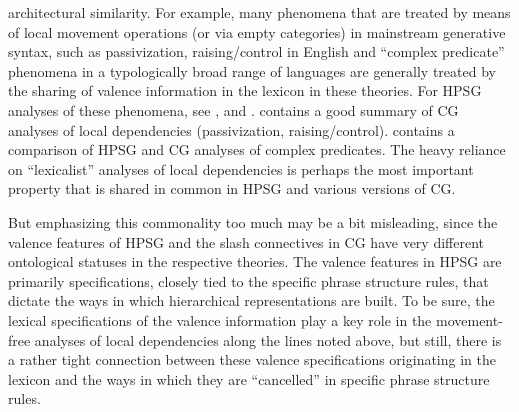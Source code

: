 \documentclass[output=paper
                ,modfonts
                ,nonflat
	        ,collection
	        ,collectionchapter
	        ,collectiontoclongg
 	        ,biblatex
                ,babelshorthands
                ,newtxmath
                ,draftmode
                ,colorlinks, citecolor=brown
]{./langsci/langscibook}
\begin{document}
architectural similarity. For example, many phenomena that are treated
by means of local movement operations (or via empty categories) in
mainstream generative syntax, such as passivization, raising/control in English
and ``complex predicate'' phenomena in a typologically broad range of
languages are generally treated by the sharing of valence information
in the lexicon in these theories. For HPSG
analyses of these phenomena, see
,  
and .
\citet{steedman2011ccg} contains a good
summary of CG analyses of local dependencies 
(passivization, raising/control). \citet{Kubota2014a-u} contains
a comparison of HPSG and CG analyses of complex predicates.
The heavy reliance on ``lexicalist'' analyses of
local dependencies 
is perhaps the most important property that is shared in common in
HPSG and various versions of CG.

But emphasizing this commonality too much may be a bit misleading,
since the valence features of HPSG and the slash connectives in CG
have very different ontological statuses in the respective theories.
The valence features in HPSG are primarily specifications, closely
tied to the specific phrase structure rules, that dictate the ways in
which hierarchical representations are built. To be sure, the lexical
specifications of the valence information play a key role in the
movement-free analyses of local dependencies along the lines noted
above, but still, there is a rather tight connection between these
valence specifications originating in the lexicon and the ways in
which they are ``cancelled'' in specific phrase structure rules.
\end{document}
